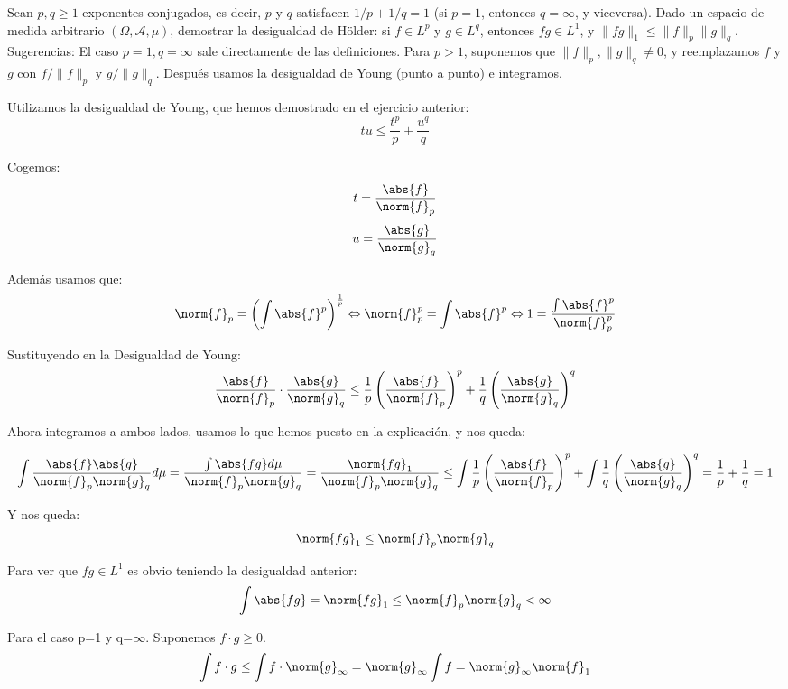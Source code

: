\begin{problem}[3] Sean $p,q \ge 1$ exponentes conjugados, es decir, $p$ y $q$ satisfacen
$1/p + 1/q =1$ (si $p=1$, entonces $q = \infty$, y viceversa).
Dado un espacio de medida arbitrario $(\Omega, \mathcal{A}, \mu)$, demostrar la desigualdad de
H\"older: si $f\in L^p$ y $g\in L^q$, entonces $fg\in L^1$, y $\|fg\|_1 \le \|f\|_p\|g\|_q$.
Sugerencias: El caso $p=1, q=\infty$ sale directamente de las definiciones.
Para $p >1$, suponemos que  $\|f\|_p, \|g\|_q\ne 0$, y reemplazamos 
$f$ y $g$ con 
 $f/\|f\|_p$ y $g/\|g\|_q$.  Despu\'es usamos la desigualdad de Young (punto a
punto) e integramos.
\solution

\begin{expla}
Utilizamos la desigualdad de Young, que hemos demostrado en el ejercicio anterior:
\[
tu\leq\frac{t^p}{p}+\frac{u^q}{q}
\]

Cogemos:
\[
t=\frac{\abs{f}}{\norm{f}_p}
\]
\[
u=\frac{\abs{g}}{\norm{g}_q}
\]

Además usamos que:
\[
\norm{f}_p=\left( \int \abs{f}^p  \right)^\frac{1}{p}  \Leftrightarrow  \norm{f}_p^p= \int \abs{f}^p \Leftrightarrow 1 = \frac{\int \abs{f}^p}{\norm{f}_p^p}
\]
\end{expla}

Sustituyendo en la Desigualdad de Young:
\[
\frac{\abs{f}}{\norm{f}_p} \cdot \frac{\abs{g}}{\norm{g}_q} \leq \frac{1}{p}\left( \frac{\abs{f}}{\norm{f}_p} \right)^p + \frac{1}{q}\left( \frac{\abs{g}}{\norm{g}_q} \right)^q 
\]

Ahora integramos a ambos lados, usamos lo que hemos puesto en la explicación, y nos queda:

\[
\int \frac{\abs{f}\abs{g}}{{\norm{f}_p}{\norm{g}_q}} d\mu =
\frac{\int \abs{fg}d\mu}{{\norm{f}_p}{\norm{g}_q}} = 
\frac{{\norm{fg}_1}}{{\norm{f}_p}{\norm{g}_q}} \leq \int \frac{1}{p}\left( \frac{\abs{f}}{\norm{f}_p} \right)^p + \int \frac{1}{q}\left( \frac{\abs{g}}{\norm{g}_q} \right)^q  = \frac{1}{p} +  \frac{1}{q} = 1 
\]

Y nos queda:
\[
\norm{fg}_1 \leq \norm{f}_p \norm{g}_q
\]

Para ver que $fg \in L^1$ es obvio teniendo la desigualdad anterior:
\[
\int \abs{fg} = \norm{fg}_1 \leq \norm{f}_p \norm{g}_q < \infty
\]

Para el caso p=1 y q=$\infty$. Suponemos $f\cdot g \geq 0$.
\[
\int f\cdot g \leq \int f \cdot \norm{g}_{\infty}= \norm{g}_{\infty} \int f = \norm{g}_{\infty} \norm{f}_{1}
\]

\end{problem}


